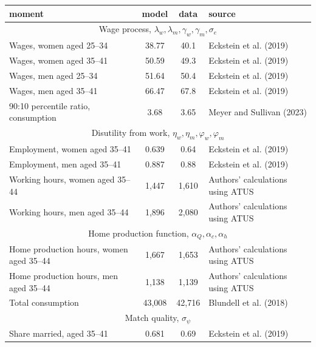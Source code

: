 \begin{tabular}{lccl} \toprule
moment & model & data & source \\ \midrule 
\multicolumn{4}{c}{Wage process, $\lambda_w,\lambda_m,\gamma_w,\gamma_m,\sigma_e$} \\ 
Wages, women aged 25--34 & 38.77 & 40.1 & Eckstein et al. (2019) \\ 
Wages, women aged 35--41 & 50.59 & 49.3 & Eckstein et al. (2019) \\ 
Wages, men aged 25--34 & 51.64 & 50.4 & Eckstein et al. (2019) \\ 
Wages, men aged 35--41 & 66.47 & 67.8 & Eckstein et al. (2019) \\ 
90:10 percentile ratio, consumption & 3.68 & 3.65 & Meyer and Sullivan (2023) \\ 
\multicolumn{4}{c}{Disutility from work, $\eta_w,\eta_m,\varphi_w,\varphi_m$} \\ 
Employment, women aged 35--41 & 0.639 & 0.64 & Eckstein et al. (2019) \\ 
Employment, men aged 35--41 & 0.887 & 0.88 & Eckstein et al. (2019) \\ 
Working hours, women aged 35--44 & 1,447 & 1,610 & Authors' calculations using ATUS \\ 
Working hours, men aged 35--44 & 1,896 & 2,080 & Authors' calculations using ATUS \\ 
\multicolumn{4}{c}{Home production function, $\alpha_Q,\alpha_c,\alpha_h$} \\ 
Home production hours, women aged 35--44 & 1,667 & 1,653 & Authors' calculations using ATUS \\ 
Home production hours, men aged 35--44 & 1,138 & 1,139 & Authors' calculations using ATUS \\ 
Total consumption & 43,008 & 42,716 & Blundell et al. (2018) \\ 
\multicolumn{4}{c}{Match quality, $\sigma_\psi$} \\ 
Share married, aged 35--41 & 0.681 & 0.69 & Eckstein et al. (2019) \\ 
\bottomrule \end{tabular}
